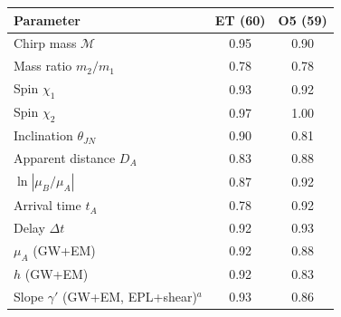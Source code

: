 \begin{tabular}{@{}lcc@{}}
\toprule
Parameter & ET (60) & O5 (59)\\
\midrule
Chirp mass $\mathcal M$ & 0.95 & 0.90\\
Mass ratio $m_2/m_1$ & 0.78 & 0.78\\
Spin $\chi_1$ & 0.93 & 0.92\\
Spin $\chi_2$ & 0.97 & 1.00\\
Inclination $\theta_{JN}$ & 0.90 & 0.81\\
Apparent distance $D_A$ & 0.83 & 0.88\\
$\ln|\mu_B/\mu_A|$ & 0.87 & 0.92\\
Arrival time $t_A$ & 0.78 & 0.92\\
Delay $\Delta t$ & 0.92 & 0.93\\
$\mu_A$ (GW+EM) & 0.92 & 0.88\\
$h$ (GW+EM) & 0.92 & 0.83\\
Slope $\gamma'$ (GW+EM, EPL+shear)$^a$ & 0.93 & 0.86\\
\bottomrule
\end{tabular}
